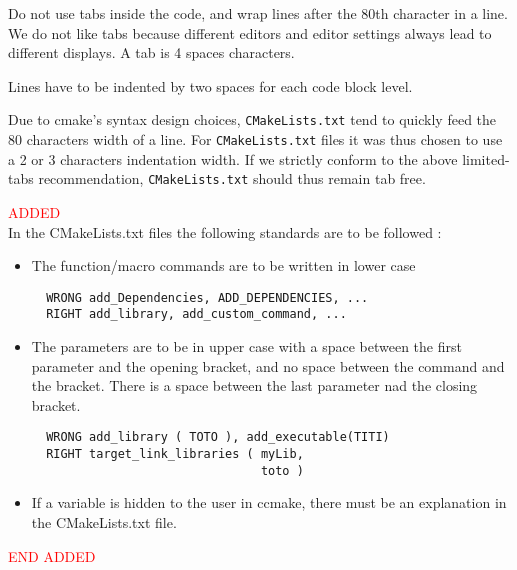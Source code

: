 \documentclass{article}
\begin{document}
Do not use tabs inside the code, and wrap lines after the 80th
character in a line. We do not like tabs because different editors and editor
settings always lead to different displays.
A tab is 4 spaces characters.

Lines have to be indented by two spaces for each code block level.

Due to cmake's syntax design choices, \texttt{CMakeLists.txt} tend to
quickly feed the 80 characters width of a line. For \texttt{CMakeLists.txt}
files it was thus chosen to use a 2 or 3 characters indentation width.
If we strictly conform to the above limited-tabs recommendation,
\texttt{CMakeLists.txt} should thus remain tab free.

\textcolor{red}{ADDED}\\
In the CMakeLists.txt files the following standards are to be followed :
\begin{itemize}
\item The function/macro commands are to be written in lower case \\
\begin{verbatim}
  WRONG add_Dependencies, ADD_DEPENDENCIES, ...
  RIGHT add_library, add_custom_command, ...
\end{verbatim}
\item The parameters are to be in upper case with a space between the first 
  parameter and the opening bracket, and no space between the command and
  the bracket. There is a space between the last parameter nad the closing 
  bracket.
\begin{verbatim}
  WRONG add_library ( TOTO ), add_executable(TITI)
  RIGHT target_link_libraries ( myLib,
                                toto )
\end{verbatim}                                
\item If a variable is hidden to the user in ccmake, there must be an 
  explanation in the CMakeLists.txt file.
\end{itemize}
\textcolor{red}{END ADDED}
\end{document}
